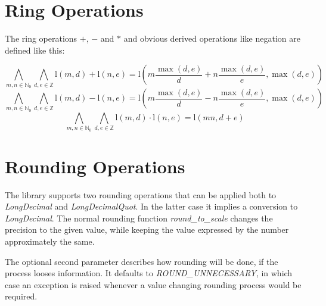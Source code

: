 \documentclass[10pt,a4paper]{article}
\def\ld{\mathrm l}
\begin{document}
\pagebreak

\section{Ring Operations}

The ring operations $+$, $-$ and $*$ and obvious derived operations
like negation are defined like this:

$$\bigwedge_{m,n \in \mathbb{N}_0} \bigwedge_{d, e \in \mathbb{Z}}
\ld(m,d) + \ld(n,e) = \ld(m \frac{\max(d, e)}{d} + n \frac{\max(d, e)}{e}, \max(d, e))$$
$$\bigwedge_{m,n \in \mathbb{N}_0} \bigwedge_{d, e \in \mathbb{Z}}
\ld(m,d) - \ld(n,e) = \ld(m \frac{\max(d, e)}{d} - n \frac{\max(d, e)}{e}, \max(d, e))$$
$$\bigwedge_{m,n \in \mathbb{N}_0} \bigwedge_{d, e \in \mathbb{Z}}
\ld(m,d) \cdot \ld(n,e) = \ld(m n, d+e)$$

\pagebreak

\section{Rounding Operations}

The library supports two rounding operations that can be applied both
to {\slshape LongDecimal\/} and {\slshape LongDecimalQuot\/}.  In the
latter case it implies a conversion to {\slshape LongDecimal\/}.  The
normal rounding function {\slshape round\_to\_scale\/} changes the
precision to the given value, while keeping the value expressed by the
number approximately the same.

The optional second parameter describes how rounding will be done, if the
process looses information.  It defaults to {\slshape
ROUND\_UNNECESSARY\/}, in which case an exception is raised whenever
a value changing rounding process would be required.
\end{document}
